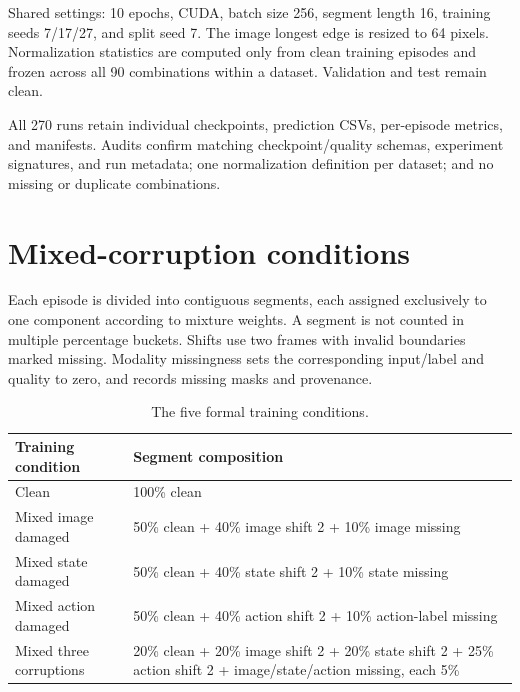 \documentclass[11pt,a4paper]{article}
\begin{document}
Shared settings: 10 epochs, CUDA, batch size 256, segment length 16, training seeds 7/17/27, and split seed 7. The image longest edge is resized to 64 pixels. Normalization statistics are computed only from clean training episodes and frozen across all 90 combinations within a dataset. Validation and test remain clean.

\begin{tcolorbox}[colback=panel,colframe=rule,title={\color{navy}\bfseries Data separation and audits},fonttitle=\bfseries]
All 270 runs retain individual checkpoints, prediction CSVs, per-episode metrics, and manifests. Audits confirm matching checkpoint/quality schemas, experiment signatures, and run metadata; one normalization definition per dataset; and no missing or duplicate combinations.
\end{tcolorbox}

\clearpage\section{Mixed-corruption conditions}

Each episode is divided into contiguous segments, each assigned exclusively to one component according to mixture weights. A segment is not counted in multiple percentage buckets. Shifts use two frames with invalid boundaries marked missing. Modality missingness sets the corresponding input/label and quality to zero, and records missing masks and provenance.

\begin{table}[htbp]
\centering
\small
\begin{tabularx}{\linewidth}{p{39mm}Y}
\toprule
Training condition & Segment composition\\
\midrule
Clean & 100\% clean\\
Mixed image damaged & 50\% clean + 40\% image shift 2 + 10\% image missing\\
Mixed state damaged & 50\% clean + 40\% state shift 2 + 10\% state missing\\
Mixed action damaged & 50\% clean + 40\% action shift 2 + 10\% action-label missing\\
Mixed three corruptions & 20\% clean + 20\% image shift 2 + 20\% state shift 2 + 25\% action shift 2 + image/state/action missing, each 5\%\\
\bottomrule
\end{tabularx}
\caption{The five formal training conditions.}
\end{table}
\end{document}
